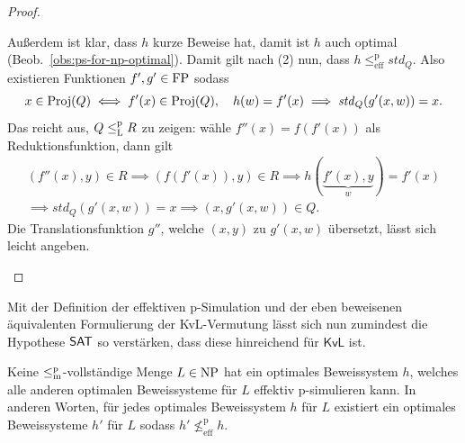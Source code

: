 \begin{proof}
\begin{prooflist}[label={}]
    Außerdem ist klar, dass $h$ kurze Beweise hat, damit ist $h$ auch optimal (Beob.~\ref{obs:ps-for-np-optimal}). %
    Damit gilt nach (2) nun, dass $h\leq^\mathrm p_\mathrm{eff} \mathit{std}_Q$. Also existieren Funktionen $f',g'\in\mathrm{FP}$ sodass
    \[ x\in \operatorname{Proj}(Q)\iff f'(x)\in\operatorname{Proj}(Q),\quad h(w)=f'(x) \implies \mathit{std}_Q(g'(x,w))=x. \]%
    Das reicht aus, $Q\leq_\mathrm{L}^\mathrm{p} R$ zu zeigen: wähle $f''(x)=f(f'(x))$ als Reduktionsfunktion, dann gilt
    \begin{gather*}
        (f''(x), y)\in R \implies (f(f'(x)), y)\in R \implies h(\underbrace{f'(x),y}_{w})=f'(x) \\
    \implies \mathit{std}_Q(g'(x,w))=x \implies (x,g'(x,w))\in Q. \end{gather*}
    Die Translationsfunktion $g''$, welche $(x,y)$ zu $g'(x,w)$ übersetzt, lässt sich leicht angeben.
\end{prooflist}
\end{proof}

Mit der Definition der effektiven p-Simulation und der eben beweisenen äquivalenten Formulierung der KvL-Vermutung lässt sich nun zumindest die Hypothese $\mathsf{SAT}$ so verstärken, dass diese hinreichend für $\mathsf{KvL}$ ist.


\begin{conjecture}
    Keine $\leq_\mathrm{m}^\mathrm{p}$-vollständige Menge $L\in\mathrm{NP}$ hat ein optimales Beweissystem $h$, welches alle anderen optimalen Beweissysteme für $L$ effektiv p-simulieren kann. 
    In anderen Worten, für jedes optimales Beweissystem $h$ für $L$ existiert ein  optimales Beweissysteme $h'$ für $L$ sodass $h'\not\leq^\mathrm p_\mathrm{eff} h$.
\end{conjecture}


